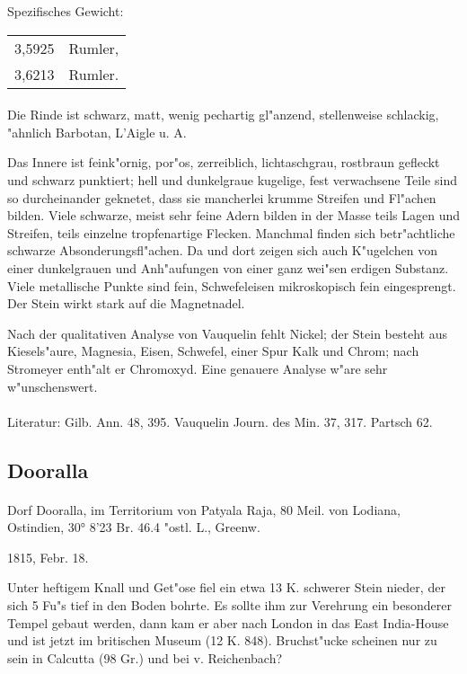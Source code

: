 \documentclass[a4paper, 11pt, oneside]{article}
\begin{document}
Spezifisches Gewicht:
\begin{table}[!ht]
    \centering
    \begin{tabular}{l l}
        3,5925 & Rumler,\\
        3,6213 & Rumler.
    \end{tabular}
\end{table}
\paragraph{}
Die Rinde ist schwarz, matt, wenig pechartig gl"anzend, stellenweise schlackig, "ahnlich Barbotan, L'Aigle u. A.

Das Innere ist feink"ornig, por"os, zerreiblich, lichtaschgrau, rostbraun gefleckt und schwarz punktiert; hell und dunkelgraue kugelige, fest verwachsene Teile sind so durcheinander geknetet, dass sie mancherlei krumme Streifen und Fl"achen bilden. Viele schwarze, meist sehr feine Adern bilden in der Masse teils Lagen und Streifen, teils einzelne tropfenartige Flecken. Manchmal finden sich betr"achtliche schwarze Absonderungsfl"achen. Da und dort zeigen sich auch K"ugelchen von einer dunkelgrauen und Anh"aufungen von einer ganz wei"sen erdigen Substanz. Viele metallische Punkte sind fein, Schwefeleisen mikroskopisch fein eingesprengt. Der Stein wirkt stark auf die Magnetnadel.

Nach der qualitativen Analyse von Vauquelin fehlt Nickel; der Stein besteht aus Kiesels"aure, Magnesia, Eisen, Schwefel, einer Spur Kalk und Chrom; nach Stromeyer enth"alt er Chromoxyd. Eine genauere Analyse w"are sehr w"unschenswert.
\footnotesize
\paragraph{}
Literatur: Gilb. Ann. 48, 395. Vauquelin Journ. des Min. 37, 317. Partsch 62.
\subsection{Dooralla}
\normalsize
\paragraph{}
Dorf Dooralla, im Territorium von Patyala Raja, 80 Meil. von Lodiana, Ostindien, 30° 8'23 Br. 46.4 "ostl. L., Greenw.

1815, Febr. 18.

Unter heftigem Knall und Get"ose fiel ein etwa 13 K. schwerer Stein nieder, der sich 5 Fu"s tief in den Boden bohrte. Es sollte ihm zur Verehrung ein besonderer Tempel gebaut werden, dann kam er aber nach London in das East India-House und ist jetzt im britischen Museum (12 K. 848). Bruchst"ucke scheinen nur zu sein in Calcutta (98 Gr.) und bei v. Reichenbach?
\end{document}
